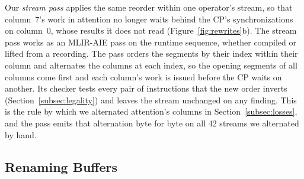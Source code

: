 Our \emph{stream pass} applies the same reorder within one operator's stream, so that column~7's work in attention no longer waits behind the CP's synchronizations on column~0, whose results it does not read (Figure~\ref{fig:rewrites}b).
The stream pass works as an MLIR-AIE pass on the runtime sequence, whether compiled or lifted from a recording.
The pass orders the segments by their index within their column and alternates the columns at each index, so the opening segments of all columns come first and each column's work is issued before the CP waits on another.
Its checker tests every pair of instructions that the new order inverts (Section~\ref{subsec:legality}) and leaves the stream unchanged on any finding.
This is the rule by which we alternated attention's columns in Section~\ref{subsec:losses}, and the pass emits that alternation byte for byte on all 42 streams we alternated by hand.

\subsection{Renaming Buffers}
\label{subsec:rings}

